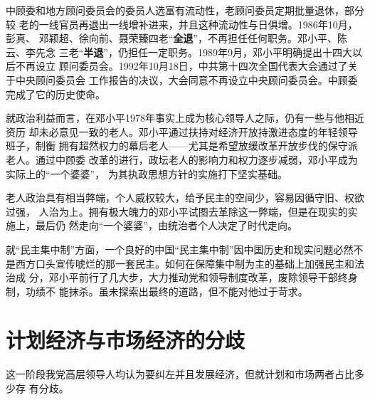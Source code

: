 中顾委和地方顾问委员会的委员人选富有流动性，老顾问委员定期批量退休，部分较
老的一线官员再退出一线增补进来，并且这种流动性与日俱增。1986年10月，彭真、
邓颖超、徐向前、聂荣臻四老“\textbf{全退}”，不再担任任何职务。邓小平、陈云、李先念
三老“\textbf{半退}”，仍担任一定职务。1989年9月，邓小平明确提出十四大以后不再设立
顾问委员会。1992年10月18日，中共第十四次全国代表大会通过了关于中央顾问委员会
工作报告的决议，大会同意不再设立中央顾问委员会。中顾委完成了它的历史使命。

就政治利益而言，在邓小平1978年事实上成为核心领导人之际，仍有一些与他相近资历
却未必意见一致的老人。邓小平通过扶持对经济开放持激进态度的年轻领导班子，制衡
拥有超然权力的幕后老人——尤其是希望放缓改革开放步伐的保守派老人。通过中顾委
改革的进行，政坛老人的影响力和权力逐步减弱，邓小平成为实际上的“一个婆婆”，
为其执政思想方针的实施打下坚实基础。

老人政治具有相当弊端，个人威权较大，给予民主的空间少，容易因循守旧、权欲过强，
人治为上。拥有极大魄力的邓小平试图去革除这一弊端，但是在现实的实施上，最后仍
然走向“一个婆婆”，由统治者个人决定了时代走向。

就“民主集中制”方面，一个良好的中国“民主集中制”因中国历史和现实问题必然不
是西方口头宣传唬烂的那一套民主。如何在保障集中制为主的基础上加强民主和法治成
分，邓小平前行了几大步，大力推动党和领导制度改革，废除领导干部终身制，功绩不
能抹杀。虽未探索出最终的道路，但不能对他过于苛求。

\section{计划经济与市场经济的分歧}




这一阶段我党高层领导人均认为要纠左并且发展经济，但就计划和市场两者占比多少存
有分歧。

